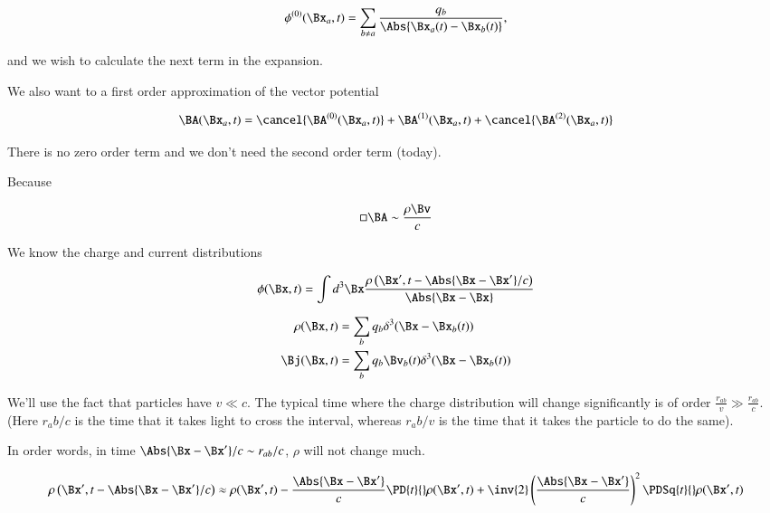\begin{equation}\label{eqn:relativisticElectrodynamicsL25:150}
\phi^{(0)}(\Bx_a, t) = \sum_{b \ne a} \frac{q_b}{\Abs{\Bx_a(t) - \Bx_b(t)}},
\end{equation}

and we wish to calculate the next term in the expansion.

We also want to a first order approximation of the vector potential

\begin{equation}\label{eqn:relativisticElectrodynamicsL25:170}
\BA(\Bx_a, t) = 
\cancel{\BA^{(0)}(\Bx_a, t)}
+\BA^{(1)}(\Bx_a, t)
+\cancel{\BA^{(2)}(\Bx_a, t)}
\end{equation}

There is no zero order term and we don't need the second order term (today).

Because

\begin{equation}\label{eqn:relativisticElectrodynamicsL25:190}
\square \BA \sim \frac{\rho \Bv}{c}
\end{equation}

We know the charge and current distributions

\begin{equation}\label{eqn:relativisticElectrodynamicsL25:210}
\phi(\Bx, t) = \int d^3 \Bx \frac{\rho\left(\Bx', t - \Abs{\Bx - \Bx'}/c\right)}{\Abs{\Bx - \Bx}}
\end{equation}

\begin{align}\label{eqn:relativisticElectrodynamicsL25:230}
\rho(\Bx, t) &= \sum_b q_b \delta^3 (\Bx - \Bx_b(t)) \\
\Bj(\Bx, t) &= \sum_b q_b \Bv_b(t) \delta^3 (\Bx - \Bx_b(t))
\end{align}

We'll use the fact that particles have $v \ll c$.  The typical time where the charge distribution will change significantly is of order $\frac{r_{ab}}{v} \gg \frac{r_{ab}}{c}$.  (Here $r_ab/c$ is the time that it takes light to cross the interval, whereas $r_ab/v$ is the time that it takes the particle to do the same).

In order words, in time $\Abs{\Bx - \Bx'}/c \sim r_{ab}/c$, $\rho$ will not change much.

\begin{equation}\label{eqn:relativisticElectrodynamicsL25:250}
\rho\left(\Bx', t - \Abs{\Bx - \Bx'}/c\right) \approx \rho(\Bx', t) 
- \frac{\Abs{\Bx - \Bx'}}{c} \PD{t}{} \rho(\Bx', t) + \inv{2} \left(\frac{\Abs{\Bx - \Bx'}}{c}\right)^2 \PDSq{t}{} \rho(\Bx', t) 
\end{equation}

